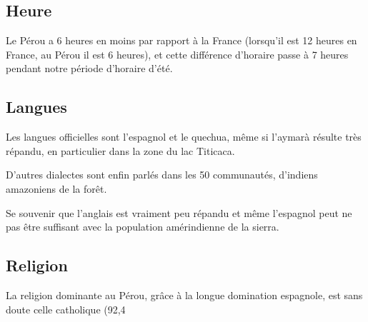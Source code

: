 \begin{multicols}{2}
\subsection{Heure}

Le Pérou a 6 heures en moins par rapport à la France (lorsqu'il est 12 heures en France, au Pérou il est 6 heures), et cette différence d'horaire passe à 7 heures pendant notre période d'horaire d'été.

\subsection{Langues}

Les langues officielles sont l'espagnol et le quechua, même si l'aymarà résulte très répandu, en particulier dans la zone du lac Titicaca.

D'autres dialectes sont enfin parlés dans les 50 communautés, d'indiens amazoniens de la forêt.

Se souvenir que l'anglais est vraiment peu répandu et même l'espagnol peut ne pas être suffisant avec la population amérindienne de la sierra.

\subsection{Religion}

La religion dominante au Pérou, grâce à la longue domination espagnole, est sans doute celle catholique (92,4%

\end{multicols}
